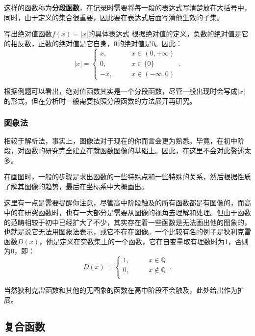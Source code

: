 这样的函数称为\textbf{分段函数}，在记录时需要将每一段的表达式写清楚放在大括号中，同时，由于定义的集合很重要，因此要在表达式后面写清他生效的子集。
\begin{example}{写出绝对值函数$f(x)=|x|$的具体表达式}
根据绝对值的定义，负数的绝对值是它的相反数，正数的绝对值是它自身，0的绝对值是0。因此：
\begin{equation}
|x|=
\begin{cases}
x,\qquad&x\in(0,+\infty)\\
0,\qquad&x\in\{0\}\\
-x,\qquad&x\in(-\infty,0)
\end{cases}~.
\end{equation}
\end{example}

根据例题可以看出，绝对值函数其实是一个分段函数，尽管一般出现时会写成$|x|$的形式，但在分析时一般需要按照分段函数的方法展开再研究。

\subsubsection{图象法}

相较于解析法，事实上，图像法对于现在的你而言会更为熟悉。毕竟，在初中阶段，对函数的研究完全建立在就函数图像的基础上。因此，在这里不会对此赘述太多。

在画图时，一般的步骤是求出函数的一些特殊点和一些特殊的关系，然后根据性质了解其图像的趋势，最后在坐标系中大概画出。

这里有一点是需要提醒你注意，尽管高中阶段触及的所有函数都是有图像的，而高中的在研究函数时，也有一大部分是需要从图像的视角去理解和处理。但由于函数的范畴相较于初中已经扩大了不少，其实存在着一些函数是无法画出他的图象的，也就是说它无法用图象法表示，或它不存在图像。一个比较有名的例子是狄利克雷函数$D(x)$，他是定义在实数集上的一个函数，它在自变量取有理数时为1，否则为0，即：
\begin{equation}\label{eq_functi_1}
D(x)=\begin{cases}
1,\qquad& x\in\mathbb{Q} \\
0,\qquad& x\notin\mathbb{Q}  \\
\end{cases} ~.
\end{equation}

当然狄利克雷函数和其他的无图象的函数在高中阶段不会触及，此处给出作为扩展。

\subsection{复合函数}

